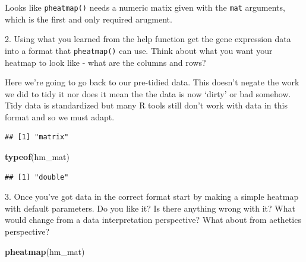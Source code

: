 \documentclass[]{book}
\newenvironment{Shaded}{\begin{snugshade}}{\end{snugshade}}
\newcommand{\CommentTok}[1]{\textcolor[rgb]{0.56,0.35,0.01}{\textit{#1}}}
\newcommand{\KeywordTok}[1]{\textcolor[rgb]{0.13,0.29,0.53}{\textbf{#1}}}
\newcommand{\NormalTok}[1]{#1}
\newcommand{\OperatorTok}[1]{\textcolor[rgb]{0.81,0.36,0.00}{\textbf{#1}}}
\newcommand{\StringTok}[1]{\textcolor[rgb]{0.31,0.60,0.02}{#1}}
\begin{document}
Looks like \texttt{pheatmap()} needs a numeric matix given with the \texttt{mat} arguments, which is the first and only required arugment.

2. Using what you learned from the help function get the gene expression data into a format that \texttt{pheatmap()} can use. Think about what you want your heatmap to look like - what are the columns and rows?

Here we're going to go back to our pre-tidied data. This doesn't negate the work we did to tidy it nor does it mean the the data is now `dirty' or bad somehow. Tidy data is standardized but many R tools still don't work with data in this format and so we must adapt.

\begin{Shaded}
\end{Shaded}

\begin{verbatim}
## [1] "matrix"
\end{verbatim}

\begin{Shaded}
\begin{Highlighting}[]
\KeywordTok{typeof}\NormalTok{(hm_mat)}
\end{Highlighting}
\end{Shaded}

\begin{verbatim}
## [1] "double"
\end{verbatim}

3. Once you've got data in the correct format start by making a simple heatmap with default parameters. Do you like it? Is there anything wrong with it? What would change from a data interpretation perspective? What about from aethetics perspective?

\begin{Shaded}
\begin{Highlighting}[]
\KeywordTok{pheatmap}\NormalTok{(hm_mat)}
\end{Highlighting}
\end{Shaded}
\end{document}
